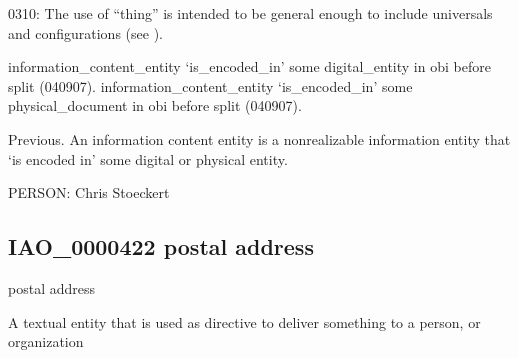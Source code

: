 \documentclass[letterpaper,10pt,english]{sphinxmanual}
\begin{document}
\begin{sphinxShadowBox}

\sphinxhyphen{}03\sphinxhyphen{}10: The use of “thing” is intended to be general enough to include universals and configurations (see ).

\sphinxAtStartPar
information\_content\_entity ‘is\_encoded\_in’ some digital\_entity in obi before split (040907). information\_content\_entity ‘is\_encoded\_in’ some physical\_document in obi before split (040907).

\sphinxAtStartPar
Previous. An information content entity is a non\sphinxhyphen{}realizable information entity that ‘is encoded in’ some digital or physical entity.
\end{sphinxShadowBox}

\begin{sphinxShadowBox}

\sphinxAtStartPar
{}
\end{sphinxShadowBox}

\begin{sphinxShadowBox}

\sphinxAtStartPar
PERSON: Chris Stoeckert
\end{sphinxShadowBox}
\begin{quote}

\ignorespaces \end{quote}


\subsection{IAO\_0000422 \sphinxhyphen{} postal address}
\label{\detokenize{doc-IAO_0000422:iao-0000422-postal-address}}\label{\detokenize{doc-IAO_0000422:index-0}}\label{\detokenize{doc-IAO_0000422::doc}}
\begin{sphinxShadowBox}

\sphinxAtStartPar
postal address
\end{sphinxShadowBox}

\begin{sphinxShadowBox}

\sphinxAtStartPar
A textual entity that is used as directive to deliver something to a person, or organization
\end{sphinxShadowBox}
\end{document}
